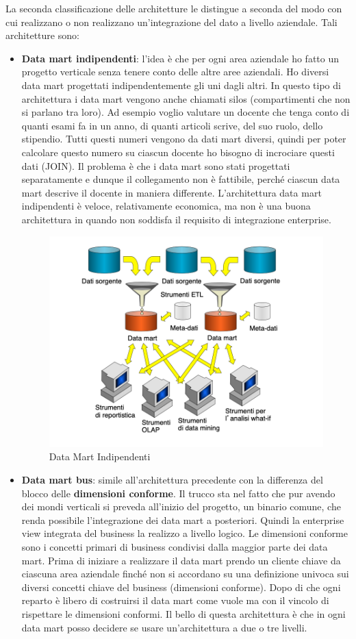 La seconda classificazione delle architetture  le distingue a seconda del modo con cui realizzano o non realizzano un’integrazione del dato a livello aziendale. Tali architetture sono:
\begin{itemize}
	\item 
	\textbf{Data mart indipendenti}: l’idea è che per ogni area aziendale ho fatto un progetto verticale senza tenere conto delle altre aree aziendali. Ho diversi data mart progettati indipendentemente gli uni dagli altri. In questo tipo di architettura i data mart vengono anche chiamati silos (compartimenti che non si parlano tra loro). Ad esempio voglio valutare un docente che tenga conto di quanti esami fa in un anno, di quanti articoli scrive, del suo ruolo, dello stipendio. Tutti questi numeri vengono da dati mart diversi, quindi per poter calcolare questo numero su ciascun docente ho bisogno di incrociare questi dati (JOIN). Il problema è che i data mart sono stati progettati separatamente e dunque il collegamento non è fattibile, perché ciascun data mart descrive il docente in maniera differente. L’architettura data mart indipendenti è veloce, relativamente economica, ma non è una buona architettura in quando non soddisfa il requisito di integrazione enterprise. 
	\begin{figure}[H]
		\centering
		\includegraphics[width=0.5\linewidth]{img/DMind}
		\caption{Data Mart Indipendenti}
		\label{fig:dmind}
	\end{figure}
	\item 
	\textbf{Data mart bus}: simile all’architettura precedente con la differenza del blocco delle \textbf{dimensioni conforme}. Il trucco sta nel fatto che pur avendo dei mondi verticali si preveda all’inizio del progetto, un binario comune, che renda possibile l’integrazione dei data mart a posteriori. Quindi la enterprise view integrata del business la realizzo a livello logico. Le dimensioni conforme sono i concetti primari di business condivisi dalla maggior parte dei data mart. Prima di iniziare a realizzare il data mart prendo un cliente chiave da ciascuna area aziendale finché non si accordano su una definizione univoca sui diversi concetti chiave del business (dimensioni conforme). Dopo di che ogni reparto è libero di costruirsi il data mart come vuole ma con il vincolo di rispettare le dimensioni conformi. Il bello di questa architettura è che in ogni data mart posso decidere se usare un’architettura a due o tre livelli.

\end{itemize}
